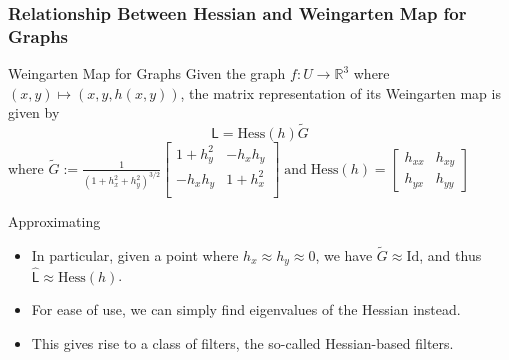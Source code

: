 \documentclass[9pt,notes]{beamer}
\newcommand{\Hess}{\mathrm{Hess}} %
\begin{document}
\begin{frame}
\frametitle{Relationship Between Hessian and Weingarten Map for Graphs}
    \begin{block}{Weingarten Map for Graphs}
    Given the graph $f: U \to \mathbb{R}^3$ where $(x,y) \mapsto (x, y, h(x,y))$, the matrix
    representation of its Weingarten map is given by
    \begin{equation*}
    \widehat{\mathsf{L}} = \mathrm{Hess}(h) \tilde{G}
    \end{equation*}
    where
    $
    \tilde{G} := \frac{1}{\left({1+h_x^2 + h_y^2}\right)^{3/2}}   
    \begin{bmatrix}
    1+h_y^2 & -h_x h_y \\
    -h_x h_y & 1 + h_x^2 \\
    \end{bmatrix}
    \;\text{and}\; \Hess(h) = \begin{bmatrix} h_{xx} & h_{xy} \\ h_{yx} & h_{yy} \end{bmatrix}
    $
  \end{block}
  \begin{block}{Approximating}
    \begin{itemize}
    \item In particular, given a point where $h_x \approx h_y \approx 0$, we
      have $\tilde{G} \approx \mathrm{Id}$, and thus
      $\widehat{\mathsf{L}} \approx \mathrm{Hess}(h)$.
    \item For ease of use, we can simply find eigenvalues of the Hessian instead.
    \item This gives rise to a class of filters, the so-called Hessian-based filters.
    \end{itemize}
  \end{block}
\end{frame}
\end{document}
